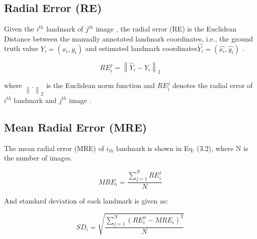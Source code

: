 \documentclass[sn-mathphys]{sn-jnl}%
\theoremstyle{thmstyleone}%
\theoremstyle{thmstyletwo}%
\theoremstyle{thmstylethree}%
\begin{document}
\par
\subsection{Radial Error (RE) }
Given the \begin{math}i^{th}\end{math} landmark of \begin{math}j^{th} \end{math}  image  , the radial error (RE)  is the Euclidean Distance between the manually annotated landmark coordinates, i.e., the ground truth value \begin{math} Y_{i} = (x_{i},y_{i})\end{math} and estimated landmark coordinates\begin{math}
\hat{Y_{i}} = (\hat{x_{i}},\hat{y_{i}})\end{math} .
\par
\begin{equation}
RE_i^{j} = \left \| \hat{Y}_i - Y_i \right \|_2
\end{equation}

where \begin{math} \left \| . \right \|_2 \end{math}
 is the Euclidean norm function and \begin{math}
 RE_i^{j}
 \end{math} denotes the radial error of \begin{math}
 i^{th}
 \end{math} landmark and \begin{math}
 j^{th}
 \end{math} image . 


\subsection{Mean Radial Error (MRE)}
 The mean radial error (MRE) of \begin{math} i_{th} \end{math} landmark is shown in Eq. (3.2), where N is the number of images.
\par
\begin{equation}
    MRE_{i} = \frac{\sum_{j=1}^{N}RE^{j}_{i}}{N}
\end{equation}


And standard deviation of each landmark is given as:
\par
\begin{equation}
    SD_{i} = \sqrt{\frac{\sum_{j=1}^{N}(RE^{n}_{i} - MRE_{i})^{2}}{N}}
\end{equation}
\end{document}
